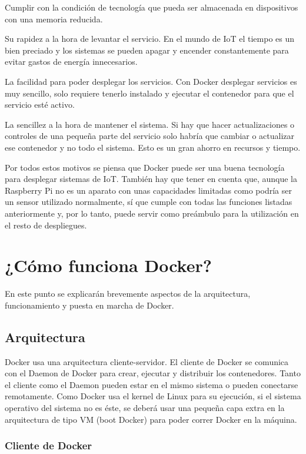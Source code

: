 Cumplir con la condición de tecnología que pueda ser almacenada en dispositivos con una memoria reducida.

Su rapidez a la hora de levantar el servicio. En el mundo de IoT el tiempo es un bien
preciado y los sistemas se pueden apagar y encender constantemente para evitar gastos de energía innecesarios.

La facilidad para poder desplegar los servicios. Con Docker desplegar servicios es muy sencillo, solo requiere tenerlo instalado y ejecutar el contenedor para que el servicio esté activo.

La sencillez a la hora de mantener el sistema. Si hay que hacer actualizaciones o controles de una pequeña parte del servicio solo habría que cambiar o actualizar ese contenedor y no todo el sistema. Esto es un gran ahorro en recursos y tiempo. 

Por todos estos motivos se piensa que Docker puede ser una buena tecnología para desplegar sistemas de IoT. También hay que tener en cuenta que, aunque la Raspberry Pi no es un aparato con unas capacidades limitadas como podría ser un sensor utilizado normalmente, sí que cumple con todas las funciones listadas anteriormente y, por lo tanto, puede servir como preámbulo para la utilización en el resto de despliegues.  

\section{¿Cómo funciona Docker?}

En este punto se explicarán brevemente aspectos de la arquitectura, funcionamiento y
puesta en marcha de Docker.  

\subsection{Arquitectura}

Docker usa una arquitectura cliente-servidor. El cliente de Docker se comunica con el
Daemon de Docker para crear, ejecutar y distribuir los contenedores. Tanto el cliente como el Daemon pueden estar en el mismo sistema o pueden conectarse remotamente.
Como Docker usa el kernel de Linux para su ejecución, si el sistema operativo del sistema no es éste, se deberá usar una pequeña capa extra en la arquitectura de tipo VM (boot Docker) para poder correr Docker en la máquina.\newline

\subsubsection{Cliente de Docker}

